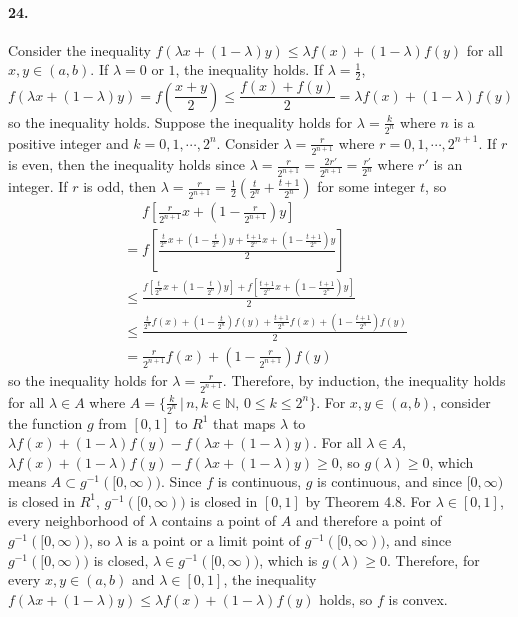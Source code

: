 \documentclass[a4paper]{article}
\begin{document}
\paragraph{24.}
Consider the inequality $f(\lambda x+(1-\lambda)y)\leq \lambda f(x)+(1-\lambda)f(y)$ for all $x,y\in (a,b)$. If $\lambda=0$ or $1$, the inequality holds. If $\lambda=\frac{1}{2}$,
\[
f(\lambda x+(1-\lambda)y)=f(\frac{x+y}{2})\leq\frac{f(x)+f(y)}{2}=\lambda f(x)+(1-\lambda)f(y)
\]
so the inequality holds. Suppose the inequality holds for $\lambda=\frac{k}{2^n}$ where $n$ is a positive integer and $k=0,1,\cdots,2^n$. Consider $\lambda=\frac{r}{2^{n+1}}$ where $r=0,1,\cdots,2^{n+1}$. If $r$ is even, then the inequality holds since $\lambda=\frac{r}{2^{n+1}}=\frac{2r'}{2^{n+1}}=\frac{r'}{2^n}$ where $r'$ is an integer. If $r$ is odd, then $\lambda=\frac{r}{2^{n+1}}=\frac{1}{2}\left(\frac{t}{2^n}+\frac{t+1}{2^n} \right)$ for some integer $t$, so
\begin{equation*}
    \begin{split}
        & \quad\,\, f\left[\frac{r}{2^{n+1}}x+\left(1-\frac{r}{2^{n+1}} \right)y \right]\\
        & =f\left[\frac{\frac{t}{2^n}x+(1-\frac{t}{2^n})y+\frac{t+1}{2^n}x+(1-\frac{t+1}{2^n})y}{2} \right]\\
        & \leq\frac{f\left[\frac{t}{2^n}x+(1-\frac{t}{2^n})y \right]+f\left[\frac{t+1}{2^n}x+(1-\frac{t+1}{2^n})y \right]}{2}\\
        & \leq \frac{\frac{t}{2^n}f(x)+(1-\frac{t}{2^n})f(y)+\frac{t+1}{2^n}f(x)+(1-\frac{t+1}{2^n})f(y)}{2}\\
        & =\frac{r}{2^{n+1}}f(x)+\left(1-\frac{r}{2^{n+1}} \right)f(y)
    \end{split}
\end{equation*}
so the inequality holds for $\lambda=\frac{r}{2^{n+1}}$. Therefore, by induction, the inequality holds for all $\lambda\in A$ where $A=\{\frac{k}{2^n}\,|\,n,k\in\mathbb{N},\,0\leq k\leq 2^n\}$. For $x,y\in(a,b)$, consider the function $g$ from $[0,1]$ to $R^1$ that maps $\lambda$ to $\lambda f(x)+(1-\lambda)f(y)-f(\lambda x+(1-\lambda)y)$. For all $\lambda \in A$,\; $\lambda f(x)+(1-\lambda)f(y)-f(\lambda x+(1-\lambda)y)\geq0$, so $g(\lambda)\geq0$, which means $A\subset g^{-1}([0,\infty))$. Since $f$ is continuous, $g$ is continuous, and since $[0,\infty)$ is closed in $R^1$,\; $g^{-1}([0,\infty))$ is closed in $[0,1]$ by Theorem 4.8. For $\lambda\in[0,1]$, every neighborhood of $\lambda$ contains a point of $A$ and therefore a point of  $g^{-1}([0,\infty))$, so $\lambda$ is a point or a limit point of $g^{-1}([0,\infty))$, and since $g^{-1}([0,\infty))$ is closed, $\lambda\in g^{-1}([0,\infty))$, which is $g(\lambda)\geq0$. Therefore, for every $x,y\in(a,b)$ and $\lambda\in[0,1]$, the inequality $f(\lambda x+(1-\lambda)y)\leq\lambda f(x)+(1-\lambda)f(y)$ holds, so $f$ is convex.
\end{document}

